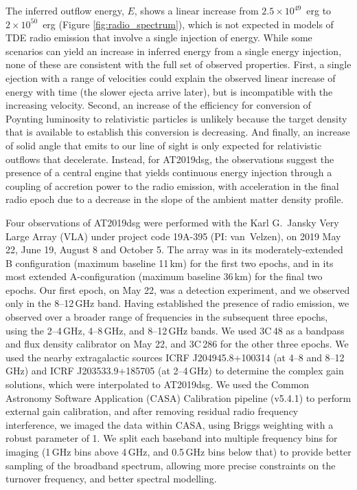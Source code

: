The inferred outflow energy, $E$, shows a linear increase from $2.5 \times 10^{49}$~erg to $2 \times 10^{50}$~erg (Figure \ref{fig:radio_spectrum}), which is not expected in models\cite{2016ApJ...819L..25A,2016ApJ...827..127K} of TDE radio emission that involve a single injection of energy. While some scenarios can yield an increase in inferred energy from a single energy injection, none of these are consistent with the full set of observed properties. First, a single ejection with a range of velocities could explain the observed linear increase of energy with time (the slower ejecta arrive later), but is incompatible with the increasing velocity. Second, an increase of the efficiency for conversion of Poynting luminosity to relativistic particles is unlikely because the target density that is available to establish this conversion is decreasing.  And finally, an increase of solid angle that emits to our line of sight is only expected for relativistic outflows that decelerate. Instead, for AT2019dsg, the observations suggest the presence of a central engine that yields continuous energy injection through a coupling of accretion power to the radio emission\cite{2018ApJ...856....1P}, with acceleration in the final radio epoch due to a decrease in the slope of the ambient matter density profile. 

Four observations of AT2019dsg were performed with the Karl G.\ Jansky Very Large Array (VLA) under project code 19A-395 (PI: van~Velzen), on 2019 May 22, June 19, August 8 and October 5.  The array was in its moderately-extended B configuration (maximum baseline 11\,km) for the first two epochs, and in its most extended A-configuration (maximum baseline 36\,km) for the final two epochs.  Our first epoch, on May 22, was a detection experiment, and we observed only in the 8--12\,GHz band.  Having established the presence of radio emission, we observed over a broader range of frequencies in the subsequent three epochs, using the 2--4\,GHz, 4--8\,GHz, and 8--12\,GHz bands.  We used 3C\,48 as a bandpass and flux density calibrator on May 22, and 3C\,286 for the other three epochs.  We used the nearby extragalactic sources ICRF J204945.8+100314 
(at 4--8 and 8--12\,GHz) and ICRF J203533.9+185705 (at 2--4\,GHz) to determine the complex gain solutions, which were interpolated to AT2019dsg. We used the Common Astronomy Software Application (CASA)\cite{McMullin2007} Calibration pipeline (v5.4.1) to perform external gain calibration, and after removing residual radio frequency interference, we imaged the data within CASA, using Briggs weighting with a robust parameter of 1.  We split each baseband into multiple frequency bins for imaging (1\,GHz bins above 4\,GHz, and 0.5\,GHz bins below that) to provide better sampling of the broadband spectrum, allowing more precise constraints on the turnover frequency, and better spectral modelling.

